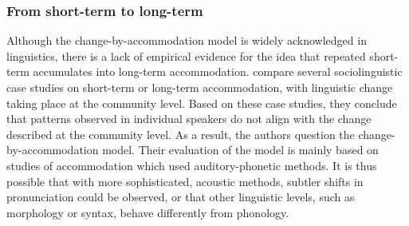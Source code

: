 \documentclass[output=paper]{langscibook}
\begin{document}
\subsubsection{From short-term to long-term}

Although the change-by-accommodation model is widely acknowledged in linguistics, there is a lack of empirical evidence for the idea that repeated short-term accumulates into long-term accommodation.
\textcite{auer_role_2005} compare several sociolinguistic case studies on short-term or long-term accommodation, with linguistic change taking place at the community level. Based on these case studies, they conclude that patterns observed in individual speakers do not align with the change described at the community level. As a result, the authors question the change-by-accommodation model. Their evaluation of the model is mainly based on studies of accommodation which used auditory-phonetic methods. It is thus possible that with more sophisticated, acoustic methods, subtler shifts in pronunciation could be observed, or that other linguistic levels, such as morphology or syntax, behave differently from phonology. 
 
\end{document}
